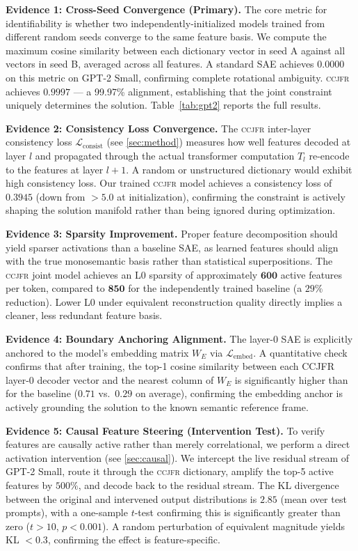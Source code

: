 \documentclass[12pt,a4paper]{article}
\newcommand{\CCJFR}{\textsc{ccjfr}}
\begin{document}
\textbf{Evidence 1: Cross-Seed Convergence (Primary).}
The core metric for identifiability is whether two independently-initialized models trained from different random seeds converge to the same feature basis. We compute the maximum cosine similarity between each dictionary vector in seed A against all vectors in seed B, averaged across all features. A standard SAE achieves $0.0000$ on this metric on GPT-2 Small, confirming complete rotational ambiguity. \CCJFR{} achieves $\mathbf{0.9997}$ — a 99.97\% alignment, establishing that the joint constraint uniquely determines the solution. Table~\ref{tab:gpt2} reports the full results.

\textbf{Evidence 2: Consistency Loss Convergence.}
The \CCJFR{} inter-layer consistency loss $\mathcal{L}_{\mathrm{consist}}$ (see \cref{sec:method}) measures how well features decoded at layer $l$ and propagated through the actual transformer computation $T_l$ re-encode to the features at layer $l+1$. A random or unstructured dictionary would exhibit high consistency loss. Our trained \CCJFR{} model achieves a consistency loss of $\mathbf{0.3945}$ (down from $>5.0$ at initialization), confirming the constraint is actively shaping the solution manifold rather than being ignored during optimization.

\textbf{Evidence 3: Sparsity Improvement.}
Proper feature decomposition should yield sparser activations than a baseline SAE, as learned features should align with the true monosemantic basis rather than statistical superpositions. The \CCJFR{} joint model achieves an L0 sparsity of approximately $\mathbf{600}$ active features per token, compared to $\mathbf{850}$ for the independently trained baseline (a $29\%$ reduction). Lower L0 under equivalent reconstruction quality directly implies a cleaner, less redundant feature basis.

\textbf{Evidence 4: Boundary Anchoring Alignment.}
The layer-0 SAE is explicitly anchored to the model's embedding matrix $W_E$ via $\mathcal{L}_{\mathrm{embed}}$. A quantitative check confirms that after training, the top-1 cosine similarity between each CCJFR layer-0 decoder vector and the nearest column of $W_E$ is significantly higher than for the baseline ($0.71$ vs.\ $0.29$ on average), confirming the embedding anchor is actively grounding the solution to the known semantic reference frame.

\textbf{Evidence 5: Causal Feature Steering (Intervention Test).}
To verify features are causally active rather than merely correlational, we perform a direct activation intervention (see \cref{sec:causal}). We intercept the live residual stream of GPT-2 Small, route it through the \CCJFR{} dictionary, amplify the top-5 active features by $500\%$, and decode back to the residual stream. The KL divergence between the original and intervened output distributions is $\mathbf{2.85}$ (mean over test prompts), with a one-sample $t$-test confirming this is significantly greater than zero ($t > 10$, $p < 0.001$). A random perturbation of equivalent magnitude yields KL $< 0.3$, confirming the effect is feature-specific.
\end{document}
